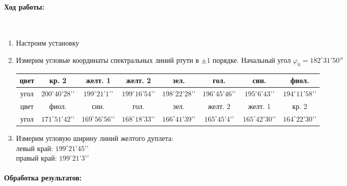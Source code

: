 \documentclass[a4paper, 12pt]{article}
\renewcommand{\phi}{\varphi}
\newcommand{\parag}[1]{\paragraph*{#1:}}
\begin{document}
\parag {Ход работы} ~

\begin{enumerate}
    \item Настроим установку
    \item Измерим угловые координаты спектральных линий ртути в $\pm 1$ порядке. Начальный угол $\phi_0 = 182^\circ 31' 50''$
    
    \begin{tabular}{|c|c|c|c|c|c|c|c|} \hline
        цвет & кр. 2 & желт. 1 & желт. 2 & зел. & гол. & син. & фиол. \\ \hline
        угол & $200^\circ 40’ 28’’$ & $199^\circ 21’ 1’’$ & $199^\circ 16’ 54’’$ & $198^\circ 22’ 28’’$ & $196^\circ 45’ 46’’$ & $195^\circ 6’ 43’’$ & $194^\circ 11’ 58’’$ \\ \hline
        цвет & фиол. & син. & гол. & зел. & желт. 2 & желт. 1 & кр. 2 \\ \hline
        угол & $171^\circ 51’ 42’’$ & $169^\circ 56’ 56’’$ & $168^\circ 18’ 33’’$ & $166^\circ 41’ 39’’$ & $165^\circ 45’ 4’’$ & $165^\circ 42’ 30’’$ & $164^\circ 22’ 30’’$ \\ \hline
    \end{tabular}

    \item Измерим угловую ширину линий желтого дуплета: \\
        левый край: $199^\circ 21’ 45’’$ \\
        правый край: $199^\circ 21’ 3’’$
\end{enumerate}

\parag {Обработка результатов} ~
\end{document}
